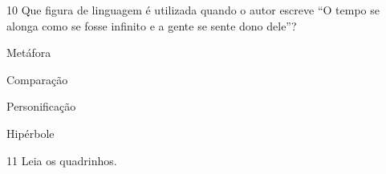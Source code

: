 




\num{10} Que figura de linguagem é utilizada quando o autor escreve ``O
tempo se alonga como se fosse infinito e a gente se sente dono dele''?

\begin{escolha}
\item Metáfora
\item Comparação
\item Personificação
\item Hipérbole
\end{escolha}



\pagebreak

\num{11} Leia os quadrinhos.

